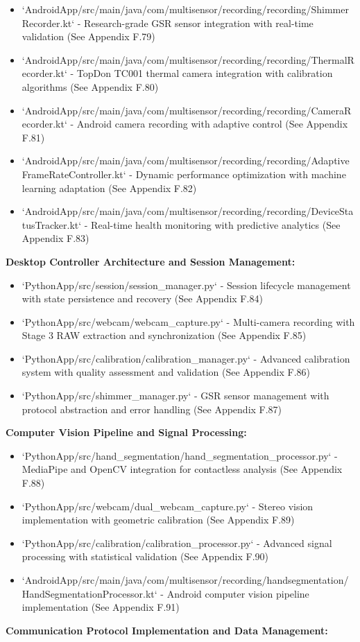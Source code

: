 \documentclass[12pt,a4paper]{report}
\begin{document}
\begin{itemize}
\item `AndroidApp/src/main/java/com/multisensor/recording/recording/ShimmerRecorder.kt` - Research-grade GSR sensor
  integration with real-time validation (See Appendix F.79)
\item `AndroidApp/src/main/java/com/multisensor/recording/recording/ThermalRecorder.kt` - TopDon TC001 thermal camera
  integration with calibration algorithms (See Appendix F.80)
\item `AndroidApp/src/main/java/com/multisensor/recording/recording/CameraRecorder.kt` - Android camera recording with
  adaptive control (See Appendix F.81)
\item `AndroidApp/src/main/java/com/multisensor/recording/recording/AdaptiveFrameRateController.kt` - Dynamic performance
  optimization with machine learning adaptation (See Appendix F.82)
\item `AndroidApp/src/main/java/com/multisensor/recording/recording/DeviceStatusTracker.kt` - Real-time health monitoring
  with predictive analytics (See Appendix F.83)

\end{itemize}
\textbf{Desktop Controller Architecture and Session Management:}

\begin{itemize}
\item `PythonApp/src/session/session_manager.py` - Session lifecycle management with state persistence and recovery (See
  Appendix F.84)
\item `PythonApp/src/webcam/webcam_capture.py` - Multi-camera recording with Stage 3 RAW extraction and synchronization (See
  Appendix F.85)
\item `PythonApp/src/calibration/calibration_manager.py` - Advanced calibration system with quality assessment and
  validation (See Appendix F.86)
\item `PythonApp/src/shimmer_manager.py` - GSR sensor management with protocol abstraction and error handling (See Appendix
  F.87)

\end{itemize}
\textbf{Computer Vision Pipeline and Signal Processing:}

\begin{itemize}
\item `PythonApp/src/hand_segmentation/hand_segmentation_processor.py` - MediaPipe and OpenCV integration for contactless
  analysis (See Appendix F.88)
\item `PythonApp/src/webcam/dual_webcam_capture.py` - Stereo vision implementation with geometric calibration (See Appendix
  F.89)
\item `PythonApp/src/calibration/calibration_processor.py` - Advanced signal processing with statistical validation (See
  Appendix F.90)
\item `AndroidApp/src/main/java/com/multisensor/recording/handsegmentation/HandSegmentationProcessor.kt` - Android computer
  vision pipeline implementation (See Appendix F.91)

\end{itemize}
\textbf{Communication Protocol Implementation and Data Management:}
\end{document}
